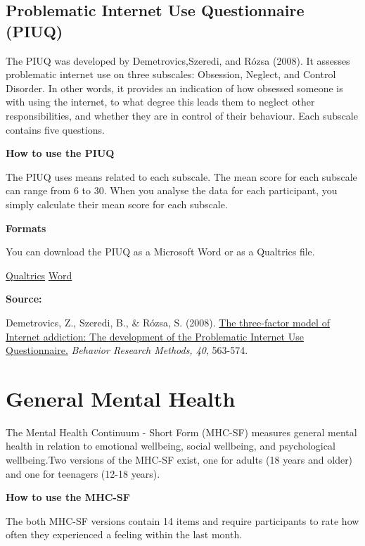 \documentclass[
]{book}
\begin{document}
\hypertarget{problematic-internet-use-questionnaire-piuq}{%
\subsection{Problematic Internet Use Questionnaire (PIUQ)}\label{problematic-internet-use-questionnaire-piuq}}

The PIUQ was developed by Demetrovics,Szeredi, and Rózsa (2008). It assesses problematic internet use on three subscales: Obsession, Neglect, and Control Disorder. In other words, it provides an indication of how obsessed someone is with using the internet, to what degree this leads them to neglect other responsibilities, and whether they are in control of their behaviour. Each subscale contains five questions.

\textbf{How to use the PIUQ}

The PIUQ uses means related to each subscale. The mean score for each subscale can range from 6 to 30. When you analyse the data for each participant, you simply calculate their mean score for each subscale.

\textbf{Formats}

You can download the PIUQ as a Microsoft Word or as a Qualtrics file.

\href{./questionnaires/Problematic_Internet_Use_Questionnaire_PIUQ.qsf}{Qualtrics} \textbar{}
\href{./questionnaires/ProblematicInternetUseQuestionnaire.docx}{Word}

\textbf{Source:}

Demetrovics, Z., Szeredi, B., \& Rózsa, S. (2008). \href{https://link.springer.com/content/pdf/10.3758/BRM.40.2.563}{The three-factor model of Internet addiction: The development of the Problematic Internet Use Questionnaire.} \emph{Behavior Research Methods, 40}, 563-574.

\hypertarget{general-mental-health}{%
\section{General Mental Health}\label{general-mental-health}}

The Mental Health Continuum - Short Form (MHC-SF) measures general mental health in relation to emotional wellbeing, social wellbeing, and psychological wellbeing.Two versions of the MHC-SF exist, one for adults (18 years and older) and one for teenagers (12-18 years).

\textbf{How to use the MHC-SF}

The both MHC-SF versions contain 14 items and require participants to rate how often they experienced a feeling within the last month.
\end{document}
